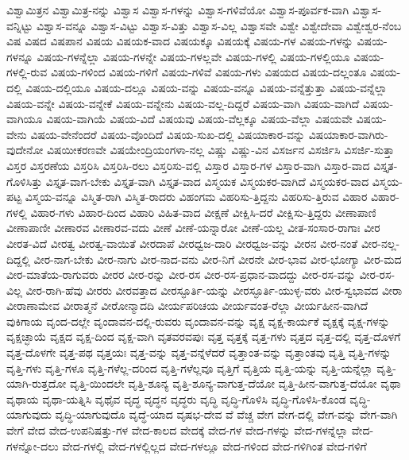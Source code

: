 {ವಿಶ್ವಾಮಿತ್ರನ
ವಿಶ್ವಾಮಿತ್ರ-ನನ್ನು
ವಿಶ್ವಾಸ
ವಿಶ್ವಾಸ-ಗಳನ್ನು
ವಿಶ್ವಾಸ-ಗಳಿವೆಯೋ
ವಿಶ್ವಾಸ-ಪೂರ್ವಕ-ವಾಗಿ
ವಿಶ್ವಾಸ-ವನ್ನಿಟ್ಟು
ವಿಶ್ವಾಸ-ವನ್ನೂ
ವಿಶ್ವಾಸ-ವಿಟ್ಟು
ವಿಶ್ವಾಸ-ವಿತ್ತು
ವಿಶ್ವಾಸ-ವಿಲ್ಲ
ವಿಶ್ವಾಸವೇ
ವಿಶ್ವೇ
ವಿಶ್ವೇದೇವಾ
ವಿಶ್ವೇಶ್ವರ-ನೆಂಬ
ವಿಷ
ವಿಷದ
ವಿಷಪಾನ
ವಿಷಯ
ವಿಷಯಕ-ವಾದ
ವಿಷಯಕ್ಕೂ
ವಿಷಯಕ್ಕೆ
ವಿಷಯ-ಗಳ
ವಿಷಯ-ಗಳನ್ನು
ವಿಷಯ-ಗಳನ್ನೂ
ವಿಷಯ-ಗಳನ್ನೆಲ್ಲಾ
ವಿಷಯ-ಗಳನ್ನೇ
ವಿಷಯ-ಗಳಲ್ಲವೇ
ವಿಷಯ-ಗಳಲ್ಲಿ
ವಿಷಯ-ಗಳಲ್ಲಿಯೂ
ವಿಷಯ-ಗಳಲ್ಲಿ-ರುವ
ವಿಷಯ-ಗಳಿಂದ
ವಿಷಯ-ಗಳಿಗೆ
ವಿಷಯ-ಗಳಿವೆ
ವಿಷಯ-ಗಳು
ವಿಷಯದ
ವಿಷಯ-ದಲ್ಲಂತೂ
ವಿಷಯ-ದಲ್ಲಿ
ವಿಷಯ-ದಲ್ಲಿಯೂ
ವಿಷಯ-ದಲ್ಲೂ
ವಿಷಯ-ವನ್ನು
ವಿಷಯ-ವನ್ನೂ
ವಿಷಯ-ವನ್ನೆತ್ತುತ್ತಾ
ವಿಷಯ-ವನ್ನೆಲ್ಲಾ
ವಿಷಯ-ವನ್ನೇ
ವಿಷಯ-ವನ್ನೇಕೆ
ವಿಷಯ-ವನ್ನೇನು
ವಿಷಯ-ವಲ್ಲ-ದಿದ್ದರೆ
ವಿಷಯ-ವಾಗಿ
ವಿಷಯ-ವಾಗಿದೆ
ವಿಷಯ-ವಾಗಿಯೂ
ವಿಷಯ-ವಾಗಿಯೆ
ವಿಷಯ-ವಿದೆ
ವಿಷಯವು
ವಿಷಯ-ವೆಲ್ಲಕ್ಕೂ
ವಿಷಯ-ವೆಲ್ಲಾ
ವಿಷಯವೇ
ವಿಷಯ-ವೇನು
ವಿಷಯ-ವೇನೆಂದರೆ
ವಿಷಯ-ವೊಂದಿದೆ
ವಿಷಯ-ಸುಖ-ದಲ್ಲಿ
ವಿಷಯಾಕಾರ-ವನ್ನು
ವಿಷಯಾಕಾರ-ವಾಗಿರು-ವುದೇನೋ
ವಿಷಯೀಕರಣವೇ
ವಿಷಯೇಂದ್ರಿಯಂಗಳಾ-ನಲ್ಲ
ವಿಷ್ಣು
ವಿಷ್ಣು-ವಿನ
ವಿಸರ್ಜನ
ವಿಸರ್ಜಿಸಿ
ವಿಸರ್ಜಿ-ಸುತ್ತಾ
ವಿಸ್ತರ
ವಿಸ್ತರಣೆಯ
ವಿಸ್ತರಿಸಿ
ವಿಸ್ತರಿಸಿ-ರಲು
ವಿಸ್ತರಿಸು-ವಲ್ಲಿ
ವಿಸ್ತಾರ
ವಿಸ್ತಾರ-ಗಳ
ವಿಸ್ತಾರ-ವಾಗಿ
ವಿಸ್ತಾರ-ವಾದ
ವಿಸ್ತೃತ-ಗೊಳಿಸಿತ್ತು
ವಿಸ್ತೃತ-ವಾಗ-ಬೇಕು
ವಿಸ್ತೃತ-ವಾಗಿ
ವಿಸ್ತೃತ-ವಾದ
ವಿಸ್ಮಯಕ
ವಿಸ್ಮಯಕರ-ವಾಗಿದೆ
ವಿಸ್ಮಯಕರ-ವಾದ
ವಿಸ್ಮಯ-ಪಟ್ಟ
ವಿಸ್ಮಯ-ವನ್ನೂ
ವಿಸ್ಮಿತ-ರಾಗಿ
ವಿಸ್ಮಿತ-ರಾದರು
ವಿಹಂಗಮ
ವಿಹರಿಸು-ತ್ತಿದ್ದನು
ವಿಹರಿಸು-ತ್ತಿರುವ
ವಿಹಾರ
ವಿಹಾರ-ಗಳಲ್ಲಿ
ವಿಹಾರ-ಗಳು
ವಿಹಾರ-ದಿಂದ
ವಿಹಾರಿ
ವಿಹಿತ-ವಾದ
ವೀಕ್ಷಣೆ
ವೀಕ್ಷಿಸಿ-ದರೆ
ವೀಕ್ಷಿಸು-ತ್ತಿದ್ದರು
ವೀಣಾಪಾಣಿ
ವೀಣಾಪಾಣೀ
ವೀಣಾರವ
ವೀಣಾರವ-ವದು
ವೀಣೆ
ವೀಣೆ-ಯನ್ನಾರೋ
ವೀಣೆ-ಯಲ್ಲ
ವೀತ-ಸಂಸಾರ-ರಾಗಾಃ
ವೀರ
ವೀರತ-ವಿದೆ
ವೀರತ್ವ
ವೀರತ್ವ-ವಾಯಿತೆ
ವೀರದಾಪೆ
ವೀರಧ್ವಜ-ದಾರಿ
ವೀರಧ್ವಜ-ವನ್ನು
ವೀರನ
ವೀರ-ನಂತೆ
ವೀರ-ನಲ್ಲ-ದಿದ್ದಲ್ಲಿ
ವೀರ-ನಾಗ-ಬೇಕು
ವೀರ-ನಾಗು
ವೀರ-ನಾದ-ವನು
ವೀರ-ನಿಗೆ
ವೀರನೇ
ವೀರ-ಭಾವ
ವೀರ-ಭೋಗ್ಯಾ
ವೀರ-ಮದ
ವೀರ-ಮಾತೆಯ-ರಾಗುವರು
ವೀರರ
ವೀರ-ರನ್ನು
ವೀರ-ರಸ
ವೀರ-ರಸ-ಪ್ರಧಾನ-ವಾದದ್ದು
ವೀರ-ರಸ-ವನ್ನು
ವೀರ-ರಸ-ವಿಲ್ಲ
ವೀರ-ರಾಗಿ-ಹೆವು
ವೀರರು
ವೀರವತ್ತಾದ
ವೀರಸ್ಫೂರ್ತಿ-ಯನ್ನು
ವೀರಸ್ಫೂರ್ತಿ-ಯುಳ್ಳ-ವರು
ವೀರ-ಸ್ವಭಾವದ
ವೀರಾ
ವೀರಾಣಾಮೇವ
ವೀರಾತ್ಮನೆ
ವೀರೋನ್ಮಾದದಿ
ವೀರ್ಯಪರಿಚಯ
ವೀರ್ಯವಂತ-ರೆಲ್ಲಾ
ವೀರ್ಯಹೀನ-ವಾಗಿದೆ
ವುಕಿಗಾಯ
ವೃಂದ-ದಲ್ಲೇ
ವೃಂದಾವನ-ದಲ್ಲಿ-ರುವರು
ವೃಂದಾವನ-ವನ್ನು
ವೃಕ್ಷ
ವೃಕ್ಷ-ಕಾರ್ಯಕೆ
ವೃಕ್ಷಕ್ಕೆ
ವೃಕ್ಷ-ಗಳನ್ನು
ವೃಕ್ಷಚ್ಛಾಯೆ
ವೃಕ್ಷದ
ವೃಕ್ಷ-ದಿಂದ
ವೃಕ್ಷ-ವಾಗಿ
ವೃತವರವಪುಃ
ವೃತ್ತ
ವೃತ್ತಕ್ಕೆ
ವೃತ್ತ-ಗಳು
ವೃತ್ತದ
ವೃತ್ತ-ದಲ್ಲಿ
ವೃತ್ತ-ದೊಳಗೆ
ವೃತ್ತ-ದೊಳಗೇ
ವೃತ್ತ-ಪಥ
ವೃತ್ತಯಃ
ವೃತ್ತ-ವನ್ನು
ವೃತ್ತ-ವನ್ನೆಳೆದರೆ
ವೃತ್ತಾಂತ-ವನ್ನು
ವೃತ್ತಾಂತವು
ವೃತ್ತಿ
ವೃತ್ತಿ-ಗಳನ್ನು
ವೃತ್ತಿ-ಗಳು
ವೃತ್ತಿ-ಗಳೂ
ವೃತ್ತಿ-ಗಳೆಲ್ಲ-ದರಿಂದ
ವೃತ್ತಿ-ಗಳೆಲ್ಲವೂ
ವೃತ್ತಿಗೆ
ವೃತ್ತಿಯ
ವೃತ್ತಿ-ಯನ್ನು
ವೃತ್ತಿ-ಯನ್ನೆಲ್ಲಾ
ವೃತ್ತಿ-ಯಾಗಿ-ರುತ್ತದೋ
ವೃತ್ತಿ-ಯಿಂದಲೇ
ವೃತ್ತಿ-ಶೂನ್ಯ
ವೃತ್ತಿ-ಶೂನ್ಯ-ವಾಗುತ್ತ-ದೆಯೋ
ವೃತ್ತಿ-ಹೀನ-ವಾಗುತ್ತ-ದೆಯೋ
ವೃಥಾ
ವೃಥಾಯ
ವೃಥಾ-ಯತ್ನಿಸಿ
ವೃಥೈವ
ವೃದ್ಧ
ವೃದ್ಧನ
ವೃದ್ಧರು
ವೃದ್ಧಿ
ವೃದ್ಧಿ-ಗೊಳಿಸಿ
ವೃದ್ಧಿ-ಗೊಳಿಸಿ-ಕೊಂಡ
ವೃದ್ಧಿ-ಯಾಗುವುದು
ವೃದ್ಧಿ-ಯಾಗುವುದೊ
ವೃದ್ಧೆ-ಯಾದ
ವೃಷಭ-ದೇವ
ವೆ
ವೆಚ್ಚ
ವೇಗ
ವೇಗ-ದಲ್ಲಿ
ವೇಗ-ವನ್ನು
ವೇಗ-ವಾಗಿ
ವೇಗೆ
ವೇದ
ವೇದ-ಉಪನಿಷತ್ತು-ಗಳ
ವೇದ-ಕಾಲದ
ವೇದಕ್ಕೆ
ವೇದ-ಗಳ
ವೇದ-ಗಳನ್ನು
ವೇದ-ಗಳನ್ನೆಲ್ಲಾ
ವೇದ-ಗಳನ್ನೋ-ದಲು
ವೇದ-ಗಳಲ್ಲಿ
ವೇದ-ಗಳಲ್ಲಿಲ್ಲದ
ವೇದ-ಗಳಲ್ಲೂ
ವೇದ-ಗಳಿಂದ
ವೇದ-ಗಳಿಗಿಂತ
ವೇದ-ಗಳಿಗೆ
}
